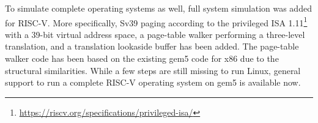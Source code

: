 To simulate complete operating systems as well, full system simulation was added for RISC-V.
More specifically, Sv39 paging according to the privileged ISA 1.11\footnote{\url{https://riscv.org/specifications/privileged-isa/}} with a 39-bit virtual address space, a page-table walker performing a three-level translation, and a translation lookaside buffer has been added.
The page-table walker code has been based on the existing gem5 code for x86 due to the structural similarities.
While a few steps are still missing to run Linux, general support to run a complete RISC-V operating system on gem5 is available now.

